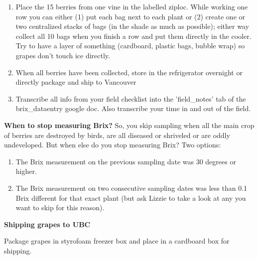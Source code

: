 \documentclass[11pt,letter]{article}
\begin{document}
\begin{enumerate}
\item Place the 15 berries from one vine in the labelled ziploc. While working one row you can either (1) put each bag next to each plant or (2) create one or two centralized stacks of bags (in the shade as much as possible); either way collect all 10 bags when you finish a row and put them directly in the cooler. Try to have a layer of something (cardboard, plastic bags, bubble wrap) so grapes don’t touch ice directly. 

\item When all berries have been collected, store in the refrigerator overnight or directly package and ship to Vancouver %


\item Transcribe all info from your field checklist into the 'field\_notes' tab of the brix\_dataentry google doc. Also transcribe your time in and out of the field. 

\end{enumerate}

{\bf When to stop measuring Brix?}
So, you skip sampling when all the main crop of berries are destroyed by birds, are all diseased or shriveled or are oddly undeveloped. But when else do you stop measuring Brix? Two options:
\begin{enumerate}
\item The Brix measurement on the previous sampling date was 30 degrees or higher.
\item The Brix measurement on two consecutive sampling dates was less than 0.1 Brix different for that exact plant (but ask Lizzie to take a look at any you want to skip for this reason).
\end{enumerate}

{\bf Shipping grapes to UBC}

Package grapes in styrofoam freezer box and place in a cardboard box for shipping. \\ %
\end{document}
